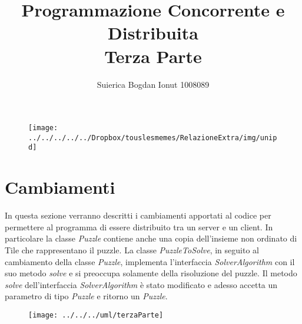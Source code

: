 \documentclass[13pt]{article}
\title{Programmazione Concorrente e Distribuita\\Terza Parte}
\author{Suierica Bogdan Ionut 1008089}
\begin{document}
\maketitle

\begin{figure}[h]
\centering
\texttt{[image: ../../../../../Dropbox/touslesmemes/RelazioneExtra/img/unipd]}
\label{fig:unipd}
\end{figure}

\newpage
\section{Cambiamenti}
In questa sezione verranno descritti i cambiamenti apportati al codice per permettere al programma di essere distribuito tra un server e un client. In particolare la classe \textit{Puzzle} contiene anche una copia dell'insieme non ordinato di Tile che rappresentano il puzzle. La classe \textit{PuzzleToSolve}, in seguito al cambiamento della classe \textit{Puzzle}, implementa l'interfaccia \textit{SolverAlgorithm} con il suo metodo \textit{solve} e si preoccupa solamente della risoluzione del puzzle. Il metodo \textit{solve} dell'interfaccia \textit{SolverAlgorithm} è stato modificato e adesso accetta un parametro di tipo \textit{Puzzle} e ritorno un \textit{Puzzle}.
\begin{figure}[h]
\centering
\texttt{[image: ../../../uml/terzaParte]}
\caption{}
\label{fig:terzaParte}
\end{figure}
\end{document}
